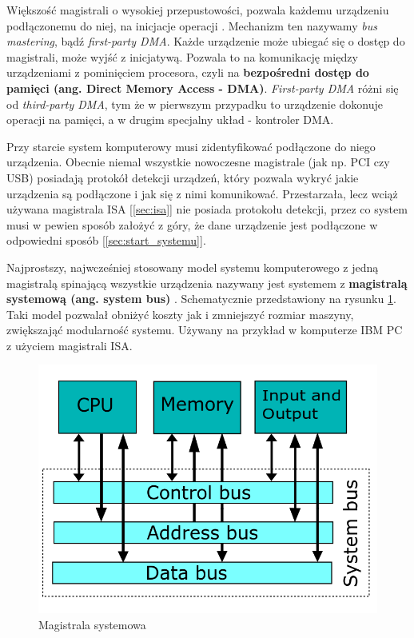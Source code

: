 \documentclass[shortabstract,inz]{iithesis}
\begin{document}
Większość magistrali o wysokiej przepustowości, pozwala każdemu urządzeniu
podłączonemu do niej, na inicjacje operacji \cite{pci_bus_mastering}. Mechanizm ten
nazywamy \textit{bus mastering}, \label{def:bus_mastering} bądź \textit{first-party DMA}.  Każde
urządzenie może ubiegać się o dostęp do magistrali, może wyjść z
inicjatywą.  Pozwala to na komunikację między urządzeniami z
pominięciem procesora, czyli na \textbf{bezpośredni dostęp do pamięci (ang. Direct Memory Access - DMA)}. 
\textit{First-party DMA} różni się od \textit{third-party DMA}, tym że w 
pierwszym przypadku to urządzenie dokonuje operacji na pamięci, a w drugim 
specjalny układ - kontroler DMA.

Przy starcie system komputerowy musi zidentyfikować podłączone do
niego urządzenia.  Obecnie niemal wszystkie nowoczesne magistrale (jak
np. PCI czy USB) posiadają protokół detekcji urządzeń, który pozwala
wykryć jakie urządzenia są podłączone i jak się z nimi komunikować.
Przestarzała, lecz wciąż używana magistrala ISA [\ref{sec:isa}] nie posiada protokołu
detekcji, przez co system musi w pewien sposób założyć z góry,
że dane urządzenie jest podłączone w odpowiedni sposób [\ref{sec:start_systemu}].

Najprostszy, najwcześniej stosowany model systemu komputerowego z jedną 
magistralą spinającą wszystkie urządzenia nazywany jest systemem z 
\textbf{magistralą systemową (ang. system bus)} \label{system_bus}.
Schematycznie przedstawiony na rysunku \ref{fig:system_bus}. 
Taki model pozwalał obniżyć koszty jak i zmniejszyć rozmiar maszyny, zwiększająć modularność systemu.
Używany na przykład w komputerze IBM PC z użyciem magistrali ISA.


\begin{figure}
  
\begin{center}
  \includegraphics[width=\linewidth/2]{computer_system_bus}
  \caption{Magistrala systemowa \cite{image:system_bus}}
\end{center}
\label{fig:system_bus}
\end{figure}
\end{document}
